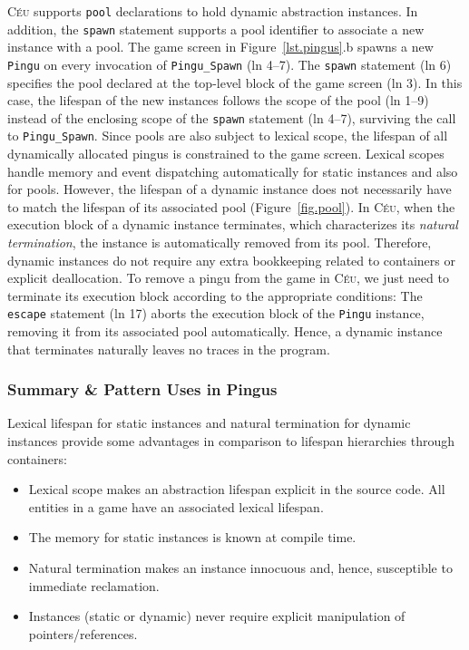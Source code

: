 \documentclass[times,twocolumn,final]{elsarticle}
\newcommand{\CEU}{\textsc{C\'{e}u}\xspace}
\newcommand{\code}[1] {{\small{\texttt{#1}}}}
\begin{document}
\CEU supports \code{pool} declarations to hold dynamic abstraction instances.
In addition, the \code{spawn} statement supports a pool identifier to associate
a new instance with a pool.
%
The game screen in Figure~\ref{lst.pingus}.b spawns a new \code{Pingu} on every
invocation of \code{Pingu\_Spawn} (ln 4--7).
%
The \code{spawn} statement (ln 6) specifies the pool declared at the top-level
block of the game screen (ln 3).
In this case, the lifespan of the new instances follows the scope of the pool
(ln 1--9) instead of the enclosing scope of the \code{spawn} statement
(ln 4--7), surviving the call to \code{Pingu\_Spawn}.
Since pools are also subject to lexical scope, the lifespan of all dynamically
allocated pingus is constrained to the game screen.
%
Lexical scopes handle memory and event dispatching automatically for static
instances and also for pools.
However, the lifespan of a dynamic instance does not necessarily have to match
the lifespan of its associated pool (Figure~\ref{fig.pool}).
In \CEU, when the execution block of a dynamic instance terminates, which
characterizes its \emph{natural termination}, the instance is automatically
removed from its pool.
Therefore, dynamic instances do not require any extra bookkeeping related to 
containers or explicit deallocation.
%
To remove a pingu from the game in \CEU, we just need to terminate its execution
block according to the appropriate conditions:
%
The \code{escape} statement (ln 17) aborts the execution block of the
\code{Pingu} instance, removing it from its associated pool automatically.
Hence, a dynamic instance that terminates naturally leaves no traces in the 
program.

\subsubsection{Summary \& Pattern Uses in Pingus}

Lexical lifespan for static instances and natural termination for dynamic
instances provide some advantages in comparison to lifespan hierarchies through
containers:

\begin{itemize}
\item Lexical scope makes an abstraction lifespan explicit in the source code.
      All entities in a game have an associated lexical lifespan.
\item The memory for static instances is known at compile time.
\item Natural termination makes an instance innocuous and, hence, susceptible
      to immediate reclamation.
\item Instances (static or dynamic) never require explicit manipulation of
      pointers/references.
\end{itemize}
\end{document}

